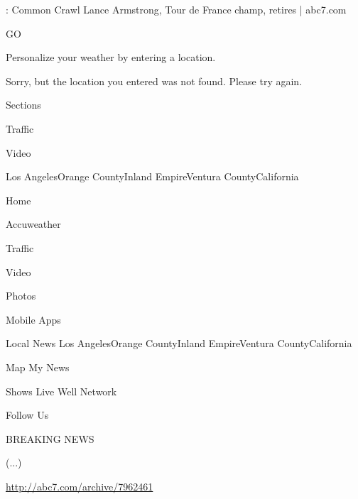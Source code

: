 \documentclass[12pt, utf8, ngerman]{beamer}
\begin{document}
\begin{frame}{\insertsection: Common Crawl}
    \scriptsize
    Lance Armstrong, Tour de France champ, retires | abc7.com

    GO

    Personalize your weather by entering a location.

    Sorry, but the location you entered was not found. Please try again.

    Sections

    Traffic

    Video

    Los AngelesOrange CountyInland EmpireVentura CountyCalifornia

    Home

    Accuweather

    Traffic

    Video

    Photos

    Mobile Apps

    Local News Los AngelesOrange CountyInland EmpireVentura CountyCalifornia

    Map My News

    Shows Live Well Network

    Follow Us

    BREAKING NEWS

    (...)

    \vspace{.2cm}
    \url{http://abc7.com/archive/7962461}
\end{frame}
\end{document}
